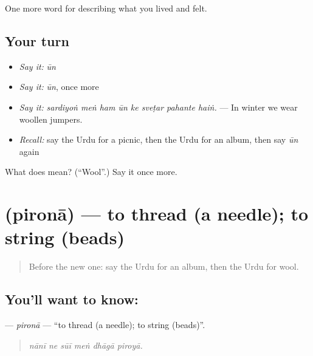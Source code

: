 \begin{grammarlens}[title={What you've built}]
One more word for describing what you lived and felt.
\end{grammarlens}

\subsection*{Your turn}
\begin{itemize}
\raggedright
  \item \emph{Say it:} \emph{ūn}
  \item \emph{Say it:} \emph{ūn}, once more
  \item \emph{Say it:} \emph{sardiyoṅ meṅ ham ūn ke sveṭar pahante haiṅ.} — In winter we wear woollen jumpers.
  \item \emph{Recall:} say the Urdu for a picnic, then the Urdu for an album, then say \emph{ūn} again
\end{itemize}

\begin{tcolorbox}[breakable,colback=teal!4,colframe=teal!35!black,title={Before you move on}]
What does  mean? (\textquotedblleft{}Wool\textquotedblright{}.) Say it once more.
\end{tcolorbox}
\section[\texorpdfstring{\ur{پرونا} (pironā)}{پرونا (pironā)}]{ (pironā) — to thread (a needle); to string (beads)}

\label{lesson:UR-C514-pirona}



\begin{quote}
Before the new one: say the Urdu for an album, then the Urdu for wool.
\end{quote}

\subsection*{You'll want to know: }
\textbf{} — \emph{pironā} — \textquotedblleft{}to thread (a needle); to string (beads)\textquotedblright{}.

\begin{quote}
     
\end{quote}

\begin{quote}
\emph{nānī ne sūī meṅ dhāgā piroyā.}
\end{quote}

